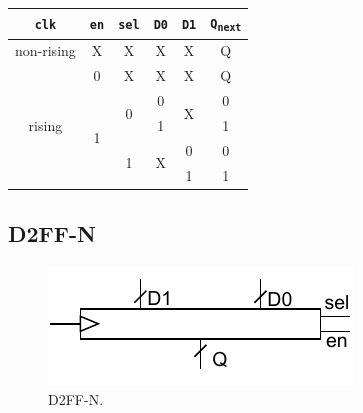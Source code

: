 \begin{table}[H]
\centering
\begin{tabular}{|c|c|c|c|c|c|}
\hline
\texttt{clk}            & \texttt{en}        & \texttt{sel}       & \texttt{D0}        & \texttt{D1}        & \texttt{Q\textsubscript{next}} \\ \hline
non-rising              & X                  & X                  & X                  & X                  & Q                    \\ \hline
\multirow{5}{*}{rising} & 0                  & X                  & X                  & X                  & Q                    \\ \cline{2-6} 
                        & \multirow{4}{*}{1} & \multirow{2}{*}{0} & 0                  & \multirow{2}{*}{X} & 0                    \\ \cline{4-4} \cline{6-6} 
                        &                    &                    & 1                  &                    & 1                    \\ \cline{3-6} 
                        &                    & \multirow{2}{*}{1} & \multirow{2}{*}{X} & 0                  & 0                    \\ \cline{5-6} 
                        &                    &                    &                    & 1                  & 1                    \\ \hline
\end{tabular}
\end{table}

\subsection{D2FF-N}\label{subsec:d2ffn}

\begin{figure}[H]
    \begin{center}
        \includegraphics[scale=1.1,clip]{img/DFF_N_block.pdf}
    \end{center}
    \vspace*{-0.5cm}
    \caption{D2FF-N.}
    \label{fig:DFFNblock}
\end{figure}

